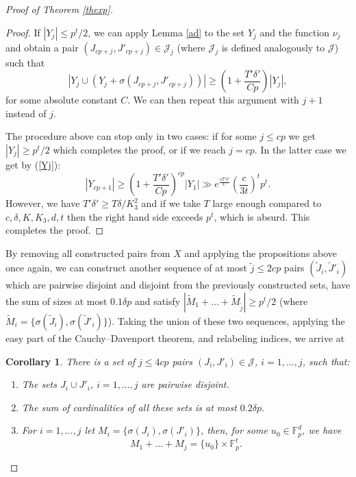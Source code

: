\documentclass{daj}
\renewcommand{\le}{\leqslant}
\renewcommand{\ge}{\geqslant}
\newcommand{\FF}{\mathbb F}
\newcommand{\J}{\mathcal J}
\newtheorem{cor}[theorem]{Corollary}
\theoremstyle{definition}
\theoremstyle{remark}
\theoremstyle{definition}
\theoremstyle{definition}
\begin{document}
\begin{proof}[Proof of Theorem \ref{thexp}]
\begin{proof}
If $|Y_j| \le p^t/2$, we can apply Lemma \ref{ad} to the set $Y_j$ and the function $\nu_j$ and obtain a pair $(J_{cp+j}, J'_{cp+j}) \in \J_j$ (where $\J_j$ is defined analogously to $\J$) such that 
\begin{equation}\label{Yj}
|Y_j \cup (Y_j + \sigma(J_{cp+j}, J'_{cp+j}))| \ge \left(1 + \frac{T' \delta'}{C p}\right) |Y_j|,    
\end{equation}
for some absolute constant $C$. We can then repeat this argument with $j+1$ instead of $j$.

The procedure above can stop only in two cases: if for some $j \le cp$ we get $|Y_j| \ge p^t/2$ which completes the proof, or if we reach $j = cp$. In the latter case we get by (\ref{Yj}):
$$
|Y_{cp+1}| \ge \left(1 + \frac{T' \delta'}{C p}\right)^{cp} |Y_1|  \gg e^{\frac{c T' \delta'}{C}} \left(\frac{c}{3t}\right)^t p^t.
$$
However, we have $T'\delta' \ge T \delta /K_3^2$ and if we take $T$ large enough compared to $c, \delta, K, K_3, d, t$ then the right hand side exceeds $p^t$, which is absurd. This completes the proof.
\end{proof}

By removing all constructed pairs from $X$ and applying the propositions above once again, we can construct another sequence of at most $\tilde j \le 2cp$ pairs $(\tilde J_{i}, \tilde J'_{i})$ which are pairwise disjoint and disjoint from the previously constructed sets, have the sum of sizes at most $0.1\delta p$ and satisfy $|\tilde M_1 + \ldots + \tilde M_{\tilde j}| \ge p^t /2$ (where $\tilde M_i = \{\sigma(\tilde J_i), \sigma(\tilde J'_i)\}$). 
Taking the union of these two sequences, applying the easy part of the Cauchy--Davenport theorem, and relabeling indices, we arrive at
\begin{cor}\label{fin}
There is a set of $j \le 4cp$ pairs $(J_i, J'_i) \in \J$, $i = 1, \ldots, j$, such that:
\begin{enumerate}
    \item The sets $J_i \cup J'_i$, $i=1, \ldots, j$ are pairwise disjoint.
    \item The sum of cardinalities of all these sets is at most $0.2 \delta p$.
    \item For $i = 1, \ldots, j$ let $M_i = \{ \sigma(J_i), \sigma(J'_i) \}$, then, for some $u_0 \in \FF_p^d$, we have
    \begin{equation}\label{M}
    M_1 + \ldots + M_j = \{u_0\} \times \FF_p^t.    
    \end{equation}
\end{enumerate}
\end{cor}


\end{proof}
\end{document}
